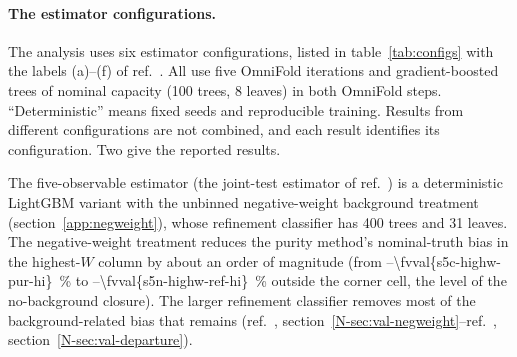 \paragraph{The estimator configurations.} The analysis uses six estimator configurations, listed in table~\ref{tab:configs} with the labels (a)--(f) of ref.~\cite{AnalysisNote2026}. All use five OmniFold iterations and gradient-boosted trees of nominal capacity (100 trees, 8 leaves) in both OmniFold steps. ``Deterministic'' means fixed seeds and reproducible training. Results from different configurations are not combined, and each result identifies its configuration. Two give the reported results.

The five-observable estimator (the joint-test estimator of ref.~\cite{AnalysisNote2026}) is a deterministic LightGBM variant with the unbinned negative-weight background treatment (section~\ref{app:negweight}), whose refinement classifier has 400 trees and 31 leaves. The negative-weight treatment reduces the purity method's nominal-truth bias in the highest-$W$ column by about an order of magnitude (from --\SI{\fvval{s5c-highw-pur-hi}}{\percent} to --\SI{\fvval{s5n-highw-ref-hi}}{\percent} outside the corner cell, the level of the no-background closure). The larger refinement classifier removes most of the background-related bias that remains (ref.~\cite{AnalysisNote2026}, section~\ref*{N-sec:val-negweight}--ref.~\cite{AnalysisNote2026}, section~\ref*{N-sec:val-departure}).

